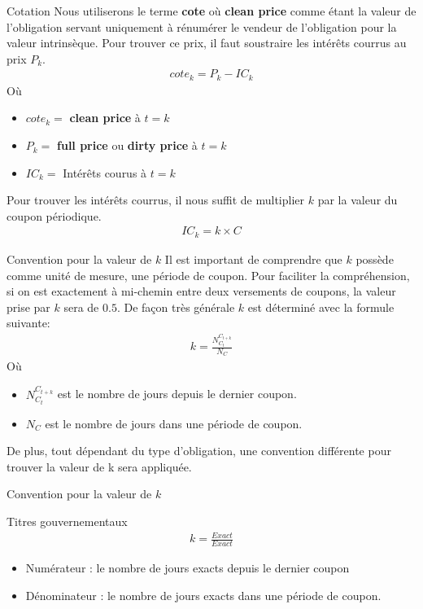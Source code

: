 \documentclass[11pt]{beamer}
\begin{document}
\begin{frame}{Cotation}
Nous utiliserons le terme \textbf{cote} où \textbf{clean price} comme étant la valeur de l'obligation servant uniquement à rénumérer le vendeur de l'obligation pour la valeur intrinsèque. Pour trouver  ce prix, il faut soustraire les intérêts courrus au prix $P_k$.
\begin{align*}
cote_k=P_k-IC_k
\end{align*}
Où
\begin{itemize}
\item $cote_k=$ \textbf{clean price} à $t=k$
\item $P_k=$ \textbf{full price} ou \textbf{dirty price} à $t=k$
\item $IC_k=$ Intérêts courus à $t=k$
\end{itemize}

Pour trouver les intérêts courrus, il nous suffit de multiplier $k$ par la valeur du coupon périodique.
\begin{align*}
IC_k= k \times C
\end{align*}
\end{frame}

\begin{frame}{Convention pour la valeur de $k$}
Il est important de comprendre que $k$ possède comme unité de mesure, une période de coupon. Pour faciliter la compréhension, si on est exactement à mi-chemin entre deux versements de coupons, la valeur prise par $k$ sera de $0.5$. De façon très générale $k$ est déterminé avec la formule suivante:
\begin{align*}
k= \frac{N_{C_{t}}^{C_{t+k}}}{N_C}
\end{align*}
Où 
\begin{itemize}
\item $N_{C_{t}}^{C_{t+k}}$ est le nombre de jours depuis le dernier coupon. 
\item $N_C$ est le nombre de jours dans une période de coupon. 
\end{itemize}
\vspace{0.5cm}
De plus, tout dépendant du type d'obligation, une convention différente pour trouver la valeur de k sera appliquée.
\end{frame}

\begin{frame}{Convention pour la valeur de $k$}
\begin{block}{Titres gouvernementaux}
\begin{align*}
k=\frac{Exact}{Exact}
\end{align*}
\begin{itemize}
\item Numérateur : le nombre de jours exacts depuis le dernier coupon
\item Dénominateur : le nombre de jours exacts dans une période de coupon.
\end{itemize}
\end{block}
\end{frame}
\end{document}
